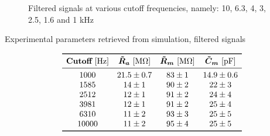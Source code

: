 \documentclass[a4paper]{article}
\begin{document}
\begin{figure}

\caption{Filtered signals at various cutoff frequencies, namely: 10, 6.3, 4, 3, 2.5, 1.6 and 1 kHz}
\label{fig:current_filtered}
\end{figure}


\begin{table}[h]
\caption{Experimental parameters retrieved from simulation, filtered signals}
\label{tab:parameters_nofilter}
\vspace{-.4cm}
\centering
\[
\begin{array}{cccc}
\toprule
\textbf{Cutoff}\ [\si{\hertz}]&\bm{\tilde{R}_a}\ [\si{\mega \ohm}]&\bm{\tilde{R}_m}\ [\si{\mega\ohm}]& \bm{\tilde{C}_m}\ [\si{\pico\farad}]\\
\midrule
1000    &   21.5    \pm 0.7 &   83  \pm 1   &   14.9    \pm 0.6 \\
1585    &   14  \pm 1   &   90  \pm 2   &   22  \pm 3   \\
2512    &   12  \pm 1   &   91  \pm 2   &   24  \pm 4   \\
3981    &   12  \pm 1   &   91  \pm 2   &   25  \pm 4   \\
6310    &   11  \pm 2   &   93  \pm 3   &   25  \pm 5   \\
10000   &   11  \pm 2   &   95  \pm 4   &   25  \pm 5   \\
\bottomrule
\end{array}
\]
\end{table}
\end{document}
